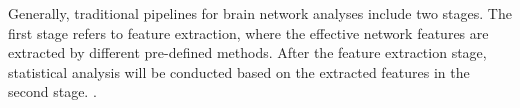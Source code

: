 Generally, traditional pipelines for brain 
network analyses include
two stages. The first stage refers to 
feature extraction, where the effective
network features are extracted by different 
pre-defined methods. After
the feature extraction stage, statistical 
analysis will be conducted based
on the extracted features in the second 
stage. \cite{Tang2023}.